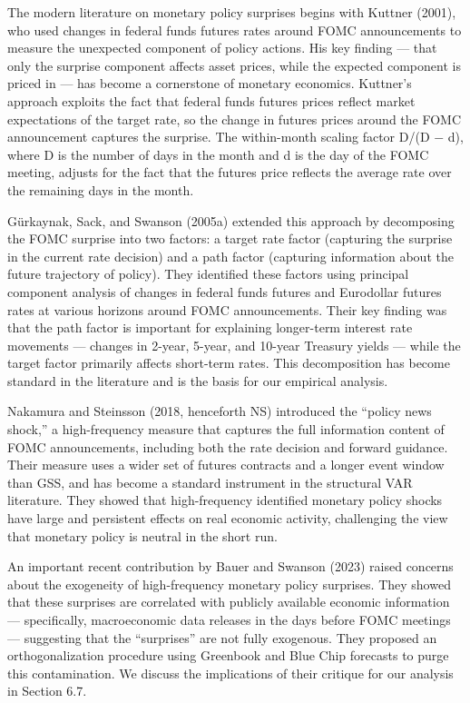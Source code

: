 \documentclass[12pt]{article}
\begin{document}
The modern literature on monetary policy surprises begins with Kuttner
(2001), who used changes in federal funds futures rates around FOMC
announcements to measure the unexpected component of policy actions. His
key finding --- that only the surprise component affects asset prices,
while the expected component is priced in --- has become a cornerstone
of monetary economics. Kuttner's approach exploits the fact that federal
funds futures prices reflect market expectations of the target rate, so
the change in futures prices around the FOMC announcement captures the
surprise. The within-month scaling factor D/(D \(-\) d), where D is the
number of days in the month and d is the day of the FOMC meeting,
adjusts for the fact that the futures price reflects the average rate
over the remaining days in the month.

Gürkaynak, Sack, and Swanson (2005a) extended this approach by
decomposing the FOMC surprise into two factors: a target rate factor
(capturing the surprise in the current rate decision) and a path factor
(capturing information about the future trajectory of policy). They
identified these factors using principal component analysis of changes
in federal funds futures and Eurodollar futures rates at various
horizons around FOMC announcements. Their key finding was that the path
factor is important for explaining longer-term interest rate movements
--- changes in 2-year, 5-year, and 10-year Treasury yields --- while the
target factor primarily affects short-term rates. This decomposition has
become standard in the literature and is the basis for our empirical
analysis.

Nakamura and Steinsson (2018, henceforth NS) introduced the ``policy
news shock,'' a high-frequency measure that captures the full
information content of FOMC announcements, including both the rate
decision and forward guidance. Their measure uses a wider set of futures
contracts and a longer event window than GSS, and has become a standard
instrument in the structural VAR literature. They showed that
high-frequency identified monetary policy shocks have large and
persistent effects on real economic activity, challenging the view that
monetary policy is neutral in the short run.

An important recent contribution by Bauer and Swanson (2023) raised
concerns about the exogeneity of high-frequency monetary policy
surprises. They showed that these surprises are correlated with publicly
available economic information --- specifically, macroeconomic data
releases in the days before FOMC meetings --- suggesting that the
``surprises'' are not fully exogenous. They proposed an
orthogonalization procedure using Greenbook and Blue Chip forecasts to
purge this contamination. We discuss the implications of their critique
for our analysis in Section 6.7.
\end{document}
